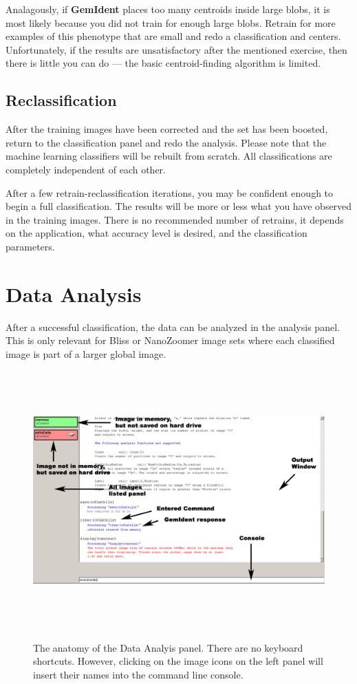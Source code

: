 \documentclass[12pt]{article}
\begin{document}
Analagously, if {\bf GemIdent} places too many centroids inside large blobs, it is most likely because you did not train for enough large blobs. Retrain for more examples of this phenotype that are small and redo a classification and centers. Unfortunately, if the results are unsatisfactory after the mentioned exercise, then there is little you can do --- the basic centroid-finding algorithm is limited.

\subsection{Reclassification}

After the training images have been corrected and the set has been boosted, return to the {\sf classification} panel and redo the analysis. Please note that the machine learning classifiers will be rebuilt from scratch. All classifications are completely independent of each other.

After a few retrain-reclassification iterations, you may be confident enough to begin a full classification. The results will be more or less what you have observed in the training images. There is no recommended number of retrains, it depends on the application, what accuracy level is desired, and the classification parameters.

\section{Data Analysis}

After a successful classification, the data can be analyzed in the {\sf analysis} panel. This is only relevant for Bliss or NanoZoomer image sets where each classified image  is part of a larger global image.

\begin{figure}[htp]
\centering
\includegraphics[width=476pt,height=281pt]{analysis.jpg}
\label{fig:analysis}
\caption{\sf The anatomy of the Data Analyis panel. There are no keyboard shortcuts. However, clicking on the image icons on the left panel will insert their names into the command line console.}
\end{figure}
\end{document}
